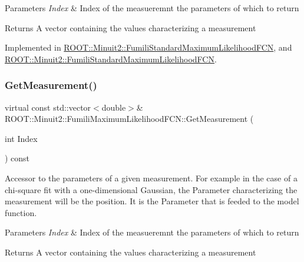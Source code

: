 \begin{DoxyParams}{Parameters}
{\em Index} & Index of the measueremnt the parameters of which to return \\
\hline
\end{DoxyParams}
\begin{DoxyReturn}{Returns}
A vector containing the values characterizing a measurement 
\end{DoxyReturn}


Implemented in \mbox{\hyperlink{classROOT_1_1Minuit2_1_1FumiliStandardMaximumLikelihoodFCN_a6eb1fbf9c0c13057e080f8ed7af7a1c2}{R\+O\+O\+T\+::\+Minuit2\+::\+Fumili\+Standard\+Maximum\+Likelihood\+F\+CN}}, and \mbox{\hyperlink{classROOT_1_1Minuit2_1_1FumiliStandardMaximumLikelihoodFCN_a942bb66ec7d48d9ec0ea3d883dff7378}{R\+O\+O\+T\+::\+Minuit2\+::\+Fumili\+Standard\+Maximum\+Likelihood\+F\+CN}}.

\mbox{\label{classROOT_1_1Minuit2_1_1FumiliMaximumLikelihoodFCN_ac3e28c8d3e14a1df3145891ae99ac35d}} 
\subsubsection{\texorpdfstring{GetMeasurement()}{GetMeasurement()}\hspace{0.1cm}{\footnotesize\ttfamily [2/2]}}
{\footnotesize\ttfamily virtual const std\+::vector$<$double$>$\& R\+O\+O\+T\+::\+Minuit2\+::\+Fumili\+Maximum\+Likelihood\+F\+C\+N\+::\+Get\+Measurement (\begin{DoxyParamCaption}\item[{int}]{Index }\end{DoxyParamCaption}) const\hspace{0.3cm}{\ttfamily [pure virtual]}}

Accessor to the parameters of a given measurement. For example in the case of a chi-\/square fit with a one-\/dimensional Gaussian, the Parameter characterizing the measurement will be the position. It is the Parameter that is feeded to the model function.


\begin{DoxyParams}{Parameters}
{\em Index} & Index of the measueremnt the parameters of which to return \\
\hline
\end{DoxyParams}
\begin{DoxyReturn}{Returns}
A vector containing the values characterizing a measurement 
\end{DoxyReturn}


